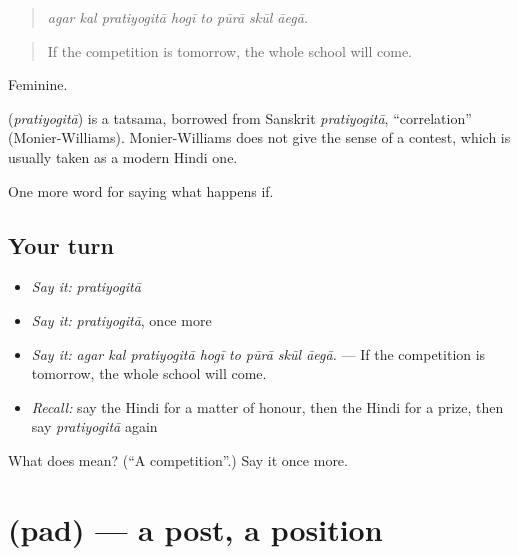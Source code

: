 \begin{quote}
\emph{agar kal pratiyogitā hogī to pūrā skūl āegā.}
\end{quote}

\begin{quote}
If the competition is tomorrow, the whole school will come.
\end{quote}

Feminine.

\begin{cousinweb}
\textbf{} (\emph{pratiyogitā}) is a tatsama, borrowed from Sanskrit \emph{pratiyogitā}, \textquotedblleft{}correlation\textquotedblright{} (Monier-Williams). Monier-Williams does not give the sense of a contest, which is usually taken as a modern Hindi one.
\end{cousinweb}

\begin{grammarlens}[title={What you've built}]
One more word for saying what happens if.
\end{grammarlens}

\subsection*{Your turn}
\begin{itemize}
\raggedright
  \item \emph{Say it:} \emph{pratiyogitā}
  \item \emph{Say it:} \emph{pratiyogitā}, once more
  \item \emph{Say it:} \emph{agar kal pratiyogitā hogī to pūrā skūl āegā.} — If the competition is tomorrow, the whole school will come.
  \item \emph{Recall:} say the Hindi for a matter of honour, then the Hindi for a prize, then say \emph{pratiyogitā} again
\end{itemize}

\begin{tcolorbox}[breakable,colback=teal!4,colframe=teal!35!black,title={Before you move on}]
What does  mean? (\textquotedblleft{}A competition\textquotedblright{}.) Say it once more.
\end{tcolorbox}
\section[\texorpdfstring{\hi{पद} (pad)}{पद (pad)}]{ (pad) — a post, a position}

\label{lesson:HI-C394-pad}



